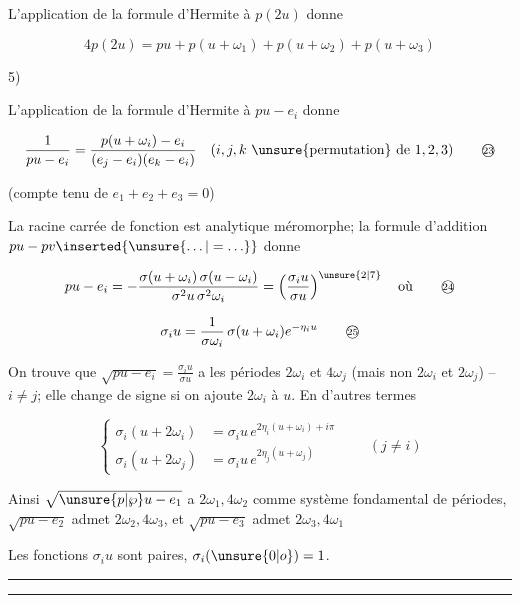 L'application de la formule d'Hermite à $p(2u)$ donne

\[
4p(2u)=pu+p(u+\omega_1)+p(u+\omega_2)+p(u+\omega_3)
\tag*{(22)}
\]

5) 

L'application de la formule d'Hermite à $pu-e_i$ donne

\[
\frac{1}{pu-e_i}=\frac{p(u+\omega_i)-e_i}{(e_j-e_i)(e_k-e_i)}
\quad(i,j,k\ \text{\unsure{permutation} de }1,2,3)
\tag*{\textcircled{\scriptsize 23}}
\]

(compte tenu de $e_1+e_2+e_3=0$)

La racine carrée de  fonction est analytique méromorphe; la formule d'addition $pu-pv\inserted{\unsure{\ldots|=\ldots}}$ donne

\[
pu-e_i=-\frac{\sigma(u+\omega_i)\,\sigma(u-\omega_i)}{\sigma^2u\,\sigma^2\omega_i}
=\left(\frac{\sigma_i u}{\sigma u}\right)^{\unsure{2|7}}\quad\text{où}
\tag*{\textcircled{\scriptsize 24}}
\]

\[
\sigma_i u=\frac{1}{\sigma\omega_i}\,\sigma(u+\omega_i)e^{-\eta_i u}
\tag*{\textcircled{\scriptsize 25}}
\]

On trouve que $\sqrt{pu-e_i}=\frac{\sigma_i u}{\sigma u}$ a les périodes $2\omega_i$ et $4\omega_j$ (mais non $2\omega_i$ et $2\omega_j$) -- $i\ne j$; elle change de signe si on ajoute $2\omega_i$ à $u$. En d'autres termes

\[
\left\{\begin{aligned}
\sigma_i(u+2\omega_i)&=\sigma_i u\,e^{2\eta_i(u+\omega_i)+i\pi}\\
\sigma_i(u+2\omega_j)&=\sigma_i u\,e^{2\eta_j(u+\omega_j)}
\end{aligned}\right.\qquad(j\ne i)
\tag*{(26)}
\]

Ainsi $\sqrt{\unsure{p|\wp}u-e_1}$ a $2\omega_1,4\omega_2$ comme système fondamental de périodes, $\sqrt{pu-e_2}$ admet $2\omega_2,4\omega_3$, et $\sqrt{pu-e_3}$ admet $2\omega_3,4\omega_1$

Les fonctions $\sigma_i u$ sont paires, $\sigma_i(\unsure{0|o})=1$.

\par\noindent\rule{\linewidth}{.4pt}\par\vspace{-1ex}\noindent\rule{\linewidth}{.4pt}\par
\begin{center}\end{center}


